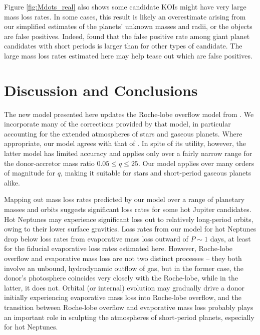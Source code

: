 \documentclass{aastex}
\begin{document}
Figure \ref{fig:Mdots_real} also shows some candidate KOIs might have very large mass loss rates. In some cases, this result is likely an overestimate arising from our simplified estimates of the planets' unknown masses and radii, or the objects are false positives. Indeed, \citet{2012A&A...545A..76S} found that the false positive rate among giant planet candidates with short periods is larger than for other types of candidate. The large mass loss rates estimated here may help tease out which are false positives.

\section{Discussion and Conclusions}
\label{sec:conclusions}

The new model presented here updates the Roche-lobe overflow model from \citet{1988A&A...202...93R}. We incorporate many of the corrections provided by that model, in particular accounting for the extended atmospheres of stars and gaseous planets. Where appropriate, our model agrees with that of \citet{1988A&A...202...93R}. In spite of its utility, however, the latter model has limited accuracy and applies only over a fairly narrow range for the donor-accretor mass ratio $0.05 \le q \le 25$. Our model applies over many orders of magnitude for $q$, making it suitable for stars and short-period gaseous planets alike. 

Mapping out mass loss rates predicted by our model over a range of planetary masses and orbits suggests significant loss rates for some hot Jupiter candidates. Hot Neptunes may experience significant loss out to relatively long-period orbits, owing to their lower surface gravities. Loss rates from our model for hot Neptunes drop below loss rates from evaporative mass loss outward of $P \sim 1$ days, at least for the fiducial evaporative loss rates estimated here. However, Roche-lobe overflow and evaporative mass loss are not two distinct processes -- they both involve an unbound, hydrodynamic outflow of gas, but in the former case, the donor's photosphere coincides very closely with the Roche-lobe, while in the latter, it does not. Orbital (or internal) evolution may gradually drive a donor initially experiencing evaporative mass loss into Roche-lobe overflow, and the transition between Roche-lobe overflow and evaporative mass loss probably plays an important role in sculpting the atmospheres of short-period planets, especially for hot Neptunes. 
\end{document}
